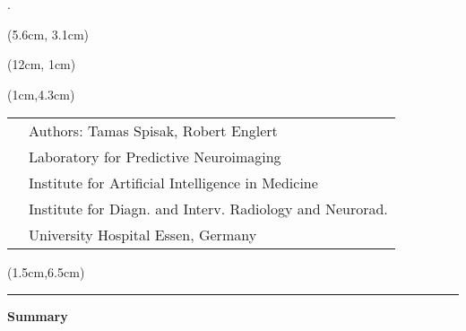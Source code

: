 \begin{titlepage}.
    

    \vspace{2.5cm}

    \begin{textblock*}{15cm}(5.6cm, 3.1cm)
        \begin{LARGE}
                \makeatletter
                \noindent\textcolor{black}{\@title}
                \makeatother
        \end{LARGE}
    \end{textblock*}
    \begin{textblock*}{12cm}(12cm, 1cm)
        \begin{LARGE}
                \makeatletter
                \noindent\textcolor{black}{\mysubtitle}
                \makeatother
        \end{LARGE}
    \end{textblock*}

    \begin{textblock*}{22cm}(1cm,4.3cm)
        \makeatletter
        \begin{large}
            \setcellgapes{0.5pt}
            \makegapedcells
            {\color{black}\begin{tabularx}{22cm}{p{4.5cm}p{10.5cm}}
                & Authors: Tamas Spisak, Robert Englert \\
                 & Laboratory for Predictive Neuroimaging   \\
                  \newline & Institute for Artificial Intelligence in Medicine  \\
                   & Institute for Diagn. and Interv. Radiology and Neurorad. \\
                \href{https://pni-lab.github.io}{\color{pniblue}{https://pni-lab.github.io}} & University Hospital Essen, Germany
            \end{tabularx}}
        \end{large}
        \makeatother
    \end{textblock*}

    \begin{textblock*}{18cm}(1.5cm,6.5cm)
        \begin{large}
            \begin{center}
                \par\noindent\rule{\textwidth\color{pniblue}}{0.4pt}
                \textbf{\color{pniblue}Summary}
            \end{center}


\end{large}
\end{textblock*}
\end{titlepage}
